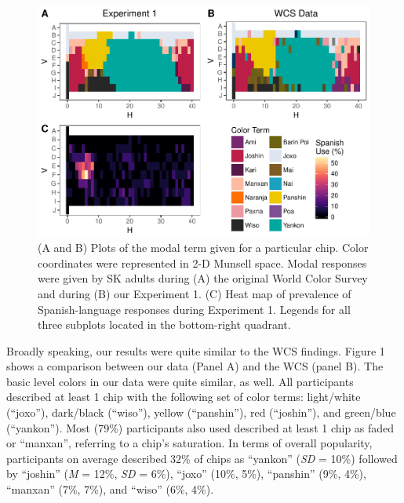\documentclass[,man,floatsintext]{apa6}
\theoremstyle{definition}
\theoremstyle{definition}
\theoremstyle{definition}
\theoremstyle{remark}
\begin{document}
\begin{figure}
\centering
\includegraphics{amazon_color_files/figure-latex/adultfigure-1.pdf}
\caption{\label{fig:adultfigure}(A and B) Plots of the modal term given for
a particular chip. Color coordinates were represented in 2-D Munsell
space. Modal responses were given by SK adults during (A) the original
World Color Survey and during (B) our Experiment 1. (C) Heat map of
prevalence of Spanish-language responses during Experiment 1. Legends
for all three subplots located in the bottom-right quadrant.}
\end{figure}

Broadly speaking, our results were quite similar to the WCS findings.
Figure 1 shows a comparison between our data (Panel A) and the WCS
(panel B). The basic level colors in our data were quite similar, as
well. All participants described at least 1 chip with the following set
of color terms: light/white (\enquote{joxo}), dark/black
(\enquote{wiso}), yellow (\enquote{panshin}), red (\enquote{joshin}),
and green/blue (\enquote{yankon}). Most (79\%) participants also used
described at least 1 chip as faded or \enquote{manxan}, referring to a
chip's saturation. In terms of overall popularity, participants on
average described 32\% of chips as \enquote{yankon} (\emph{SD} = 10\%)
followed by \enquote{joshin} (\emph{M} = 12\%, \emph{SD} = 6\%),
\enquote{joxo} (10\%, 5\%), \enquote{panshin} (9\%, 4\%),
\enquote{manxan} (7\%, 7\%), and \enquote{wiso} (6\%, 4\%).
\end{document}
